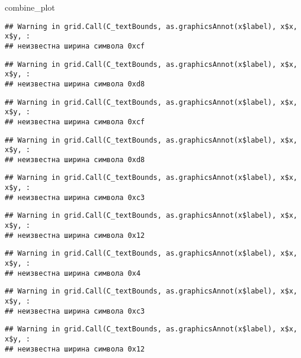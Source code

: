 \documentclass[
]{article}
\newenvironment{Shaded}{\begin{snugshade}}{\end{snugshade}}
\newcommand{\NormalTok}[1]{#1}
\begin{document}
\begin{Shaded}
\begin{Highlighting}[]
\NormalTok{combine\_plot}
\end{Highlighting}
\end{Shaded}

\begin{verbatim}
## Warning in grid.Call(C_textBounds, as.graphicsAnnot(x$label), x$x, x$y, :
## неизвестна ширина символа 0xcf
\end{verbatim}

\begin{verbatim}
## Warning in grid.Call(C_textBounds, as.graphicsAnnot(x$label), x$x, x$y, :
## неизвестна ширина символа 0xd8
\end{verbatim}

\begin{verbatim}
## Warning in grid.Call(C_textBounds, as.graphicsAnnot(x$label), x$x, x$y, :
## неизвестна ширина символа 0xcf
\end{verbatim}

\begin{verbatim}
## Warning in grid.Call(C_textBounds, as.graphicsAnnot(x$label), x$x, x$y, :
## неизвестна ширина символа 0xd8
\end{verbatim}

\begin{verbatim}
## Warning in grid.Call(C_textBounds, as.graphicsAnnot(x$label), x$x, x$y, :
## неизвестна ширина символа 0xc3
\end{verbatim}

\begin{verbatim}
## Warning in grid.Call(C_textBounds, as.graphicsAnnot(x$label), x$x, x$y, :
## неизвестна ширина символа 0x12
\end{verbatim}

\begin{verbatim}
## Warning in grid.Call(C_textBounds, as.graphicsAnnot(x$label), x$x, x$y, :
## неизвестна ширина символа 0x4
\end{verbatim}

\begin{verbatim}
## Warning in grid.Call(C_textBounds, as.graphicsAnnot(x$label), x$x, x$y, :
## неизвестна ширина символа 0xc3
\end{verbatim}

\begin{verbatim}
## Warning in grid.Call(C_textBounds, as.graphicsAnnot(x$label), x$x, x$y, :
## неизвестна ширина символа 0x12
\end{verbatim}
\end{document}
